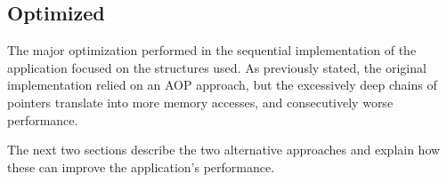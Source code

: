 \subsection{Optimized}


The major optimization performed in the sequential implementation of the \polu application focused on the structures used. As previously stated, the original implementation relied on an AOP approach, but the excessively deep chains of pointers translate into more memory accesses, and consecutively worse performance.

The next two sections describe the two alternative approaches and explain how these can improve the application's performance.


